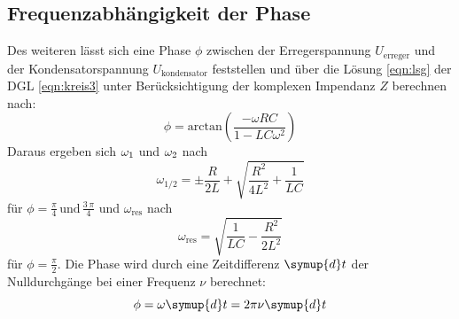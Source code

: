 \subsection{Frequenzabhängigkeit der Phase}
Des weiteren lässt sich eine Phase $\phi$ zwischen der Erregerspannung
$U_\text{erreger}$ und der Kondensatorspannung $U_\text{kondensator}$  feststellen und über
die Lösung \eqref{eqn:lsg} der DGL \eqref{eqn:kreis3} unter Berücksichtigung der komplexen Impendanz $Z$ berechnen nach:
\begin{equation}
  \phi = \text{arctan}\left(\frac{-\omega RC}{1-LC\omega^2}\right)
  \label{eqn:phase}
\end{equation}
Daraus ergeben sich $\omega_\text1$ und $\omega_\text2$ nach
\begin{equation}
  \omega_{1/2} = \pm \frac{R}{2L} + \sqrt{\frac{R^{2}}{4L^{2}} + \frac{1}{LC}}
  \label{o12}
\end{equation}
für $\phi = \frac{\pi}{4}\,\text{und}\, \frac{3\,\pi}{4}$ und $\omega_\text{res}$ nach
\begin{equation}
  \omega_\text{res}=\sqrt{\frac{1}{LC}-\frac{R^2}{2L^2}}
\end{equation}
für $\phi = \frac{\pi}{2}$.
Die Phase wird durch eine Zeitdifferenz $\symup{d}t$ der Nulldurchgänge bei einer Frequenz $\nu$
berechnet:
\begin{equation}
  \phi = \omega \symup{d}t = 2\pi\nu \symup{d}t
\end{equation}
